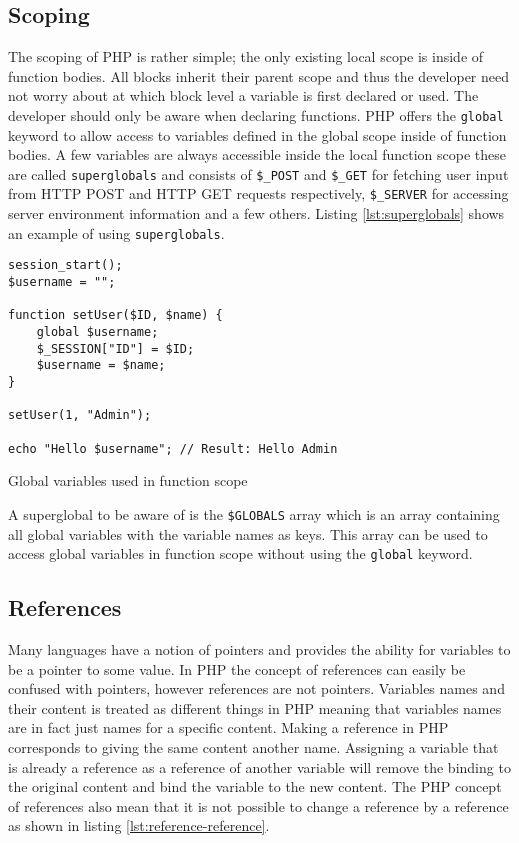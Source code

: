\subsection{Scoping}
\label{sec:backg_scoping}
The scoping of PHP is rather simple; the only existing local scope is inside of function bodies. All blocks inherit their parent scope and thus the developer need not worry about at which block level a variable is first declared or used. The developer should only be aware when declaring functions. PHP offers the \texttt{global} keyword to allow access to variables defined in the global scope inside of function bodies. A few variables are always accessible inside the local function scope these are called \texttt{superglobals} and consists of \texttt{\$\_POST} and \texttt{\$\_GET} for fetching user input from HTTP POST and HTTP GET requests respectively, \texttt{\$\_SERVER} for accessing server environment information and a few others. Listing \ref{lst:superglobals} shows an example of using \texttt{superglobals}.
\begin{program}
\begin{lstlisting}
session_start();
$username = "";

function setUser($ID, $name) {
    global $username;
    $_SESSION["ID"] = $ID;
    $username = $name;
}

setUser(1, "Admin");

echo "Hello $username"; // Result: Hello Admin
\end{lstlisting}
\caption{Global variables used in function scope}
\label{lst:superglobals}
\end{program}

A superglobal to be aware of is the \texttt{\$GLOBALS} array which is an array containing all global variables with the variable names as keys. This array can be used to access global variables in function scope without using the \texttt{global} keyword.


\subsection{References}
\label{sec:backg_references}
Many languages have a notion of pointers and provides the ability for variables to be a pointer to some value. In PHP the concept of references can easily be confused with pointers, however references are not pointers. Variables names and their content is treated as different things in PHP meaning that variables names are in fact just names for a specific content. Making a reference in PHP corresponds to giving the same content another name. Assigning a variable that is already a reference as a reference of another variable will remove the binding to the original content and bind the variable to the new content. The PHP concept of references also mean that it is not possible to change a reference by a reference as shown in listing \ref{lst:reference-reference}.

